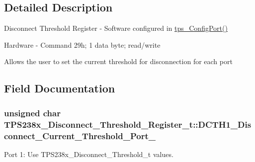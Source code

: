 \subsection{Detailed Description}
Disconnect Threshold Register -\/ Software configured in \hyperlink{_t_p_s23861_8c_a2b787818ef7e374af218c952d3ca8a08}{tps\-\_\-\-Config\-Port()} \par
 Hardware -\/ Command 29h; 1 data byte; read/write \par
\par
 Allows the user to set the current threshold for disconnection for each port 

\subsection{Field Documentation}
\hypertarget{struct_t_p_s238x___disconnect___threshold___register__t_ab5c99a4c2b09787945bcf9a5830098f3}{
\subsubsection[{D\-C\-T\-H1\-\_\-\-Disconnect\-\_\-\-Current\-\_\-\-Threshold\-\_\-\-Port\-\_\-1}]{\setlength{\rightskip}{0pt plus 5cm}unsigned char T\-P\-S238x\-\_\-\-Disconnect\-\_\-\-Threshold\-\_\-\-Register\-\_\-t\-::\-D\-C\-T\-H1\-\_\-\-Disconnect\-\_\-\-Current\-\_\-\-Threshold\-\_\-\-Port\-\_}}\label{struct_t_p_s238x___disconnect___threshold___register__t_ab5c99a4c2b09787945bcf9a5830098f3}


Port 1\-: Use T\-P\-S238x\-\_\-\-Disconnect\-\_\-\-Threshold\-\_\-t values. 

